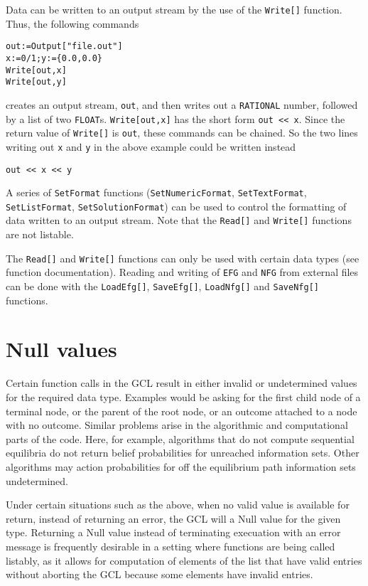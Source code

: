 Data can be written to an output stream by the use of the
\verb+Write[]+ function.  Thus, the following commands

\begin{verbatim}
out:=Output["file.out"]
x:=0/1;y:={0.0,0.0}
Write[out,x]
Write[out,y]
\end{verbatim}

\noindent
creates an output stream, \verb+out+, and then writes out a
\verb+RATIONAL+ number, followed by a list of two \verb+FLOAT+s.
\verb+Write[out,x]+ has the short form \verb+out << x+.  Since the
return value of \verb+Write[]+ is \verb+out+, these commands can be
chained.  So the two lines writing out \verb+x+ and \verb+y+ in the
above example could be written instead

\begin{verbatim}
out << x << y
\end{verbatim}
 
A series of \verb+SetFormat+ functions (\verb+SetNumericFormat+,
\verb+SetTextFormat+, \verb+SetListFormat+, \verb+SetSolutionFormat+)
can be used to control the formatting of data written to an output
stream.  Note that the \verb+Read[]+ and \verb+Write[]+ functions are
not listable.

The \verb+Read[]+ and \verb+Write[]+ functions can only be used with
certain data types (see function documentation).  Reading and writing
of \verb+EFG+ and \verb+NFG+ from external files can be done with the
\verb+LoadEfg[]+, \verb+SaveEfg[]+, \verb+LoadNfg[]+ and
\verb+SaveNfg[]+ functions.

\section{Null values}

Certain function calls in the GCL result in either invalid or
undetermined values for the required data type. Examples would be
asking for the first child node of a terminal node, or the parent of
the root node, or an outcome attached to a node with no outcome.
Similar problems arise in the algorithmic and computational parts of
the code.  Here, for example, algorithms that do not compute
sequential equilibria do not return belief probabilities for unreached
information sets.  Other algorithms may action probabilities for off
the equilibrium path information sets undetermined.  

Under certain situations such as the above, when no valid value is
available for return, instead of returning an error, the GCL will
a Null value for the given type.  Returning a Null value instead of
terminating execuation with an error message is frequently desirable
in a setting where functions are being called listably, as it allows
for computation of elements of the list that have valid entries
without aborting the GCL because some elements have invalid entries.  

